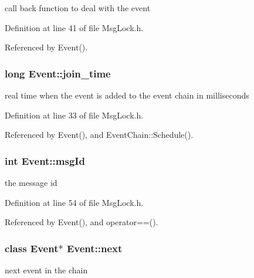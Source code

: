 call back function to deal with the event 



\-Definition at line 41 of file \-Msg\-Lock.\-h.



\-Referenced by \-Event().

\hypertarget{classEvent_a585aca2566e1db426a025ea97b55a74a}{
\subsubsection[{join\-\_\-time}]{\setlength{\rightskip}{0pt plus 5cm}long {\bf \-Event\-::join\-\_\-time}}}\label{d5/da5/classEvent_a585aca2566e1db426a025ea97b55a74a}


real time when the event is added to the event chain in milliseconds 



\-Definition at line 33 of file \-Msg\-Lock.\-h.



\-Referenced by \-Event(), and \-Event\-Chain\-::\-Schedule().

\hypertarget{classEvent_af7d83ab02ea78a76a229d077a701ed5d}{
\subsubsection[{msg\-Id}]{\setlength{\rightskip}{0pt plus 5cm}int {\bf \-Event\-::msg\-Id}}}\label{d5/da5/classEvent_af7d83ab02ea78a76a229d077a701ed5d}


the message id 



\-Definition at line 54 of file \-Msg\-Lock.\-h.



\-Referenced by \-Event(), and operator==().

\hypertarget{classEvent_a88dc0fa91acbfbcfb1d2014491630d39}{
\subsubsection[{next}]{\setlength{\rightskip}{0pt plus 5cm}class {\bf \-Event}$\ast$ {\bf \-Event\-::next}}}\label{d5/da5/classEvent_a88dc0fa91acbfbcfb1d2014491630d39}


next event in the chain 



